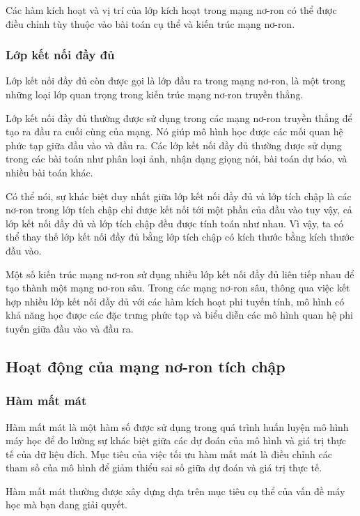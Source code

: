 Các hàm kích hoạt và vị trí của lớp kích hoạt trong mạng nơ-ron có thể được điều chỉnh tùy thuộc vào bài toán cụ thể và kiến trúc mạng nơ-ron.

\subsubsection{Lớp kết nối đầy đủ}
Lớp kết nối đầy đủ còn được gọi là lớp đầu ra trong mạng nơ-ron, là một trong những loại lớp quan trọng trong kiến trúc mạng nơ-ron truyền thẳng.

Lớp kết nối đầy đủ thường được sử dụng trong các mạng nơ-ron truyền thẳng để tạo ra đầu ra cuối cùng của mạng. Nó giúp mô hình học được các mối quan hệ phức tạp giữa đầu vào và đầu ra. Các lớp kết nối đầy đủ thường được sử dụng trong các bài toán như phân loại ảnh, nhận dạng giọng nói, bài toán dự báo, và nhiều bài toán khác.

Có thể nói, sự khác biệt duy nhất giữa lớp kết nối đầy đủ và lớp tích chập là các nơ-ron trong lớp tích chập chỉ được kết nối tới một phần của đầu vào tuy vậy, cả lớp kết nối đầy đủ và lớp tích chập đều được tính toán như nhau. Vì vậy, ta có thể thay thế lớp kết nối đầy đủ bằng lớp tích chập có kích thước bằng kích thước đầu vào.

Một số kiến trúc mạng nơ-ron sử dụng nhiều lớp kết nối đầy đủ liên tiếp nhau để tạo thành một mạng nơ-ron sâu. Trong các mạng nơ-ron sâu, thông qua việc kết hợp nhiều lớp kết nối đầy đủ với các hàm kích hoạt phi tuyến tính, mô hình có khả năng học được các đặc trưng phức tạp và biểu diễn các mô hình quan hệ phi tuyến giữa đầu vào và đầu ra.

\subsection{Hoạt động của mạng nơ-ron tích chập}
\subsubsection{Hàm mất mát}

Hàm mất mát là một hàm số được sử dụng trong quá trình huấn luyện mô hình máy học để đo lường sự khác biệt giữa các dự đoán của mô hình và giá trị thực tế của dữ liệu đích. Mục tiêu của việc tối ưu hàm mất mát là điều chỉnh các tham số của mô hình để giảm thiểu sai số giữa dự đoán và giá trị thực tế.

Hàm mất mát thường được xây dựng dựa trên mục tiêu cụ thể của vấn đề máy học mà bạn đang giải quyết.

